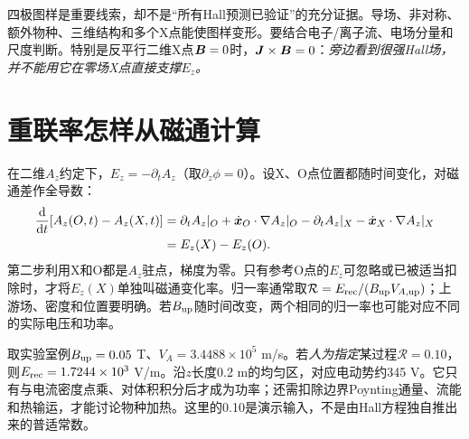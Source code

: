 四极图样是重要线索，却不是“所有Hall预测已验证”的充分证据。导场、非对称、额外物种、三维结构和多个X点能使图样变形。要结合电子/离子流、电场分量和尺度判断。特别是反平行二维X点$\bm{B}=0$时，$\bm{J}\times\bm{B}=0$：\emph{旁边看到很强Hall场，并不能用它在零场X点直接支撑$E_z$。}

\section{重联率怎样从磁通计算}
在二维$A_z$约定下，$E_z=-\partial_tA_z$（取$\partial_z\phi=0$）。设X、O点位置都随时间变化，对磁通差作全导数：
\begin{align}
\frac{\mathrm d}{\mathrm d t}[A_z(O,t)-A_z(X,t)]
&=\partial_tA_z|_O+\dot{\bm{x}}_O\cdot\nabla A_z|_O
-\partial_tA_z|_X-\dot{\bm{x}}_X\cdot\nabla A_z|_X\\
&=E_z(X)-E_z(O).
\end{align}
第二步利用X和O都是$A_z$驻点，梯度为零。只有参考O点的$E_z$可忽略或已被适当扣除时，才将$E_z(X)$单独叫磁通变化率。归一率通常取$\mathcal R=E_{\rm rec}/(B_{\rm up}V_{A,\rm up})$；上游场、密度和位置要明确。若$B_{\rm up}$随时间改变，两个相同的归一率也可能对应不同的实际电压和功率。

取实验室例$B_{\rm up}=0.05$ T、$V_A=3.4488\times10^5$ m/s。若\emph{人为指定}某过程$\mathcal R=0.10$，则$E_{\rm rec}=1.7244\times10^3$ V/m。沿$z$长度0.2 m的均匀区，对应电动势约345 V。它只有与电流密度点乘、对体积积分后才成为功率；还需扣除边界Poynting通量、流能和热输运，才能讨论物种加热。这里的0.10是演示输入，不是由Hall方程独自推出来的普适常数。
